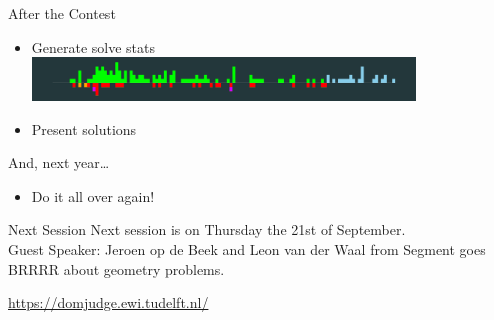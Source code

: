 \documentclass[11pt,pdf, aspectratio=169]{beamer}
\begin{document}
  \begin{frame}{After the Contest}
    \begin{itemize}
      \item Generate solve stats \\[0.5em]
      \includegraphics[width=0.8\textwidth]{images/session-3/solve-stats.png}
      \item Present solutions
    \end{itemize}

    \vspace{2em}
    And, next year\dots

    \begin{itemize}
      \item Do it all over again!
    \end{itemize}
  \end{frame}

  \begin{frame}{Next Session}
    Next session is on Thursday the 21st of September.\\
    Guest Speaker: Jeroen op de Beek and Leon van der Waal from Segment goes BRRRR about geometry problems.

    \url{https://domjudge.ewi.tudelft.nl/}
  \end{frame}
\end{document}
